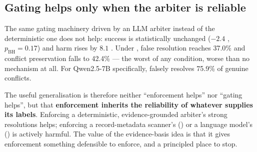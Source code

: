 \subsection{Gating helps only when the arbiter is reliable}

The same gating machinery driven by an LLM arbiter instead of the deterministic one does not help: success is
statistically unchanged ($-2.4$\pp{} , $p_{\text{BH}}=0.17$) and harm rises by $8.1$\pp{}
. Under , false resolution reaches 37.0\% and conflict preservation falls to 42.4\% --- the
worst of any condition, worse than no mechanism at all. For Qwen2.5-7B specifically,  falsely resolves
75.9\% of genuine conflicts.

The useful generalisation is therefore neither ``enforcement helps'' nor ``gating helps'', but that
\textbf{enforcement inherits the reliability of whatever supplies its labels}. Enforcing a deterministic,
evidence-grounded arbiter's strong resolutions helps; enforcing a record-metadata scanner's () or a
language model's () is actively harmful. The value of the evidence-basis idea is that it gives
enforcement something defensible to enforce, and a principled place to stop.
